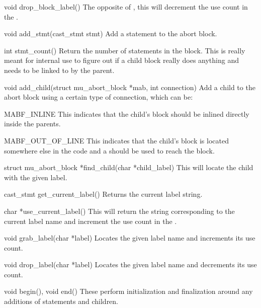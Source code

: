 \begin{cprototypelist}
  \item[void drop_block_label()] The opposite of ,
  this will decrement the use count in the .

  \item[void add_stmt(cast_stmt stmt)] Add a statement to the abort block.

  \item[int stmt_count()] Return the number of statements in the
  block.  This is really meant for internal use to figure out if a child block
  really does anything and needs to be linked to by the parent.

  \item[void add_child(struct mu_abort_block *mab, int
  connection)] Add a child to the abort block using a certain type of
  connection, which can be:

  \begin{cidentifierlist}
    \item[MABF_INLINE] This indicates that the
    child's \CAST{} block should be inlined directly inside the parents.

    \item[MABF_OUT_OF_LINE] This indicates that the child's
    \CAST{} block is located somewhere else in the code and a
     should be used to reach the block.
  \end{cidentifierlist}

  \item[struct mu_abort_block *find_child(char *child_label)] This
  will locate the child with the given label.

  \item[cast_stmt get_current_label()] Returns the current label string.

  \item[char *use_current_label()] This will return the string
  corresponding to the current label name and increment the use count in the
  .

  \item[void grab_label(char *label)] Locates the given label name
  and increments its use count.

  \item[void drop_label(char *label)] Locates the given label name
  and decrements its use count.

  \item[void begin(), void end()] These perform initialization and
  finalization around any additions of statements and children.


\end{cprototypelist}

